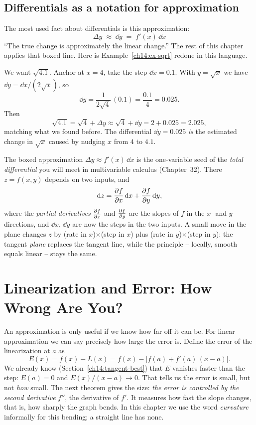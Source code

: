 \subsection{Differentials as a notation for approximation}

The most used fact about differentials is this approximation:
\[
\boxed{\;\Delta y \;\approx\; \dd y \;=\; f'(x)\,\dd x\;}
\]
``The true change is approximately the linear change.'' The rest of
this chapter applies that boxed line. Here is
Example~\ref{ch14:ex-sqrt} redone in this language.

\begin{example}
\label{ch14:ex-sqrt-diff}
We want $\sqrt{4.1}$. Anchor at $x=4$, take the step $\dd x = 0.1$. With
$y=\sqrt{x}$ we have $\dd y = \dd x/(2\sqrt{x})$, so
\[
\dd y = \frac{1}{2\sqrt 4}\,(0.1) = \frac{0.1}{4} = 0.025.
\]
Then
\[
\sqrt{4.1} = \sqrt 4 + \Delta y \approx \sqrt 4 + \dd y = 2 + 0.025 = 2.025,
\]
matching what we found before. The differential $\dd y=0.025$ \emph{is} the
estimated change in $\sqrt{x}$ caused by nudging $x$ from $4$ to $4.1$.
\end{example}

\begin{connectionbox}
The boxed approximation $\Delta y \approx f'(x)\,\dd x$ is the one-variable seed
of the \emph{total differential} you will meet in multivariable calculus
(Chapter~32). There $z=f(x,y)$ depends on two inputs, and
\[
\mathrm{d} z = \frac{\partial f}{\partial x}\,\mathrm{d} x + \frac{\partial f}{\partial y}\,\mathrm{d} y,
\]
where the \emph{partial derivatives} $\frac{\partial f}{\partial x}$ and $\frac{\partial f}{\partial y}$ are the slopes of
$f$ in the $x$- and $y$-directions, and $\dd x$, $\dd y$ are now the steps in the
two inputs. A small move in the plane changes $z$ by
(rate in $x$)$\times$(step in $x$) plus (rate in $y$)$\times$(step in $y$): the
tangent \emph{plane} replaces the tangent line, while the principle -- locally,
smooth equals linear -- stays the same.
\end{connectionbox}

\section{Linearization and Error: How Wrong Are You?}
\label{ch14:error}

An approximation is only useful if we know how far off it can be. For linear
approximation we can say precisely how large the error is. Define the error of the linearization at $a$ as
\[
E(x) = f(x) - L(x) = f(x) - \bigl[f(a)+f'(a)\,(x-a)\bigr].
\]
We already know (Section~\ref{ch14:tangent-best}) that $E$ vanishes faster than
the step: $E(a)=0$ and $E(x)/(x-a)\to 0$. That tells us the error is small, but
not \emph{how} small. The next theorem gives the size:
\emph{the error is controlled by the second derivative} $f''$, the derivative of
$f'$. It measures how fast the slope changes, that is, how sharply the graph bends.
In this chapter we use the word \emph{curvature} informally for this bending; a
straight line has none.

